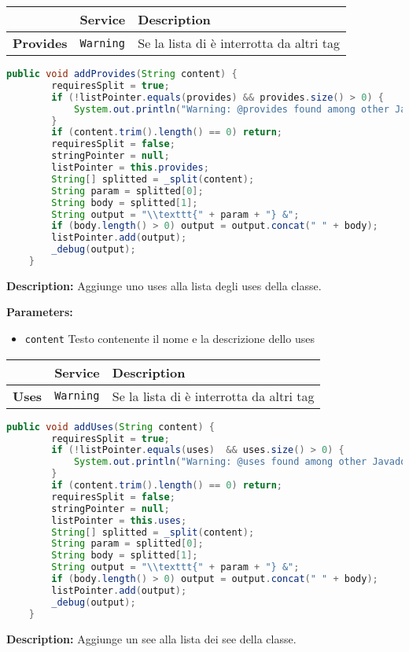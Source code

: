 \documentclass{article}
\begin{document}
\begin{table}[!h]\centering
\begin{tabular}{|l|p{}|p{}|}
\hline & \textbf{Service} & \textbf{Description} \\ \hline
\multirow{1}{*}{\textbf{Provides}}
& \texttt{Warning} & Se la lista di è interrotta da altri tag \\
\hline
\end{tabular}\end{table}
\begin{lstlisting}[language=Java]
    public void addProvides(String content) {
        requiresSplit = true;
        if (!listPointer.equals(provides) && provides.size() > 0) {
            System.out.println("Warning: @provides found among other Javadoc keywords. You should put all @provides together.");
        }
        if (content.trim().length() == 0) return;
        requiresSplit = false;
        stringPointer = null;
        listPointer = this.provides;
        String[] splitted = _split(content);
        String param = splitted[0];
        String body = splitted[1];
        String output = "\\texttt{" + param + "} &";
        if (body.length() > 0) output = output.concat(" " + body);
        listPointer.add(output);
        _debug(output);
    }
\end{lstlisting}
\textbf{Description:}  Aggiunge uno uses alla lista degli uses della classe. 

\textbf{Parameters:}
\begin{itemize}
  \item\texttt{content} Testo contenente il nome e la descrizione dello uses  
\end{itemize}

\begin{table}[!h]\centering
\begin{tabular}{|l|p{}|p{}|}
\hline & \textbf{Service} & \textbf{Description} \\ \hline
\multirow{1}{*}{\textbf{Uses}}
& \texttt{Warning} & Se la lista di è interrotta da altri tag \\
\hline
\end{tabular}\end{table}
\begin{lstlisting}[language=Java]
    public void addUses(String content) {
        requiresSplit = true;
        if (!listPointer.equals(uses)  && uses.size() > 0) {
            System.out.println("Warning: @uses found among other Javadoc keywords. You should put all @uses together.");
        }
        if (content.trim().length() == 0) return;
        requiresSplit = false;
        stringPointer = null;
        listPointer = this.uses;
        String[] splitted = _split(content);
        String param = splitted[0];
        String body = splitted[1];
        String output = "\\texttt{" + param + "} &";
        if (body.length() > 0) output = output.concat(" " + body);
        listPointer.add(output);
        _debug(output);
    }
\end{lstlisting}
\textbf{Description:}  Aggiunge un see alla lista dei see della classe. 
\end{document}
